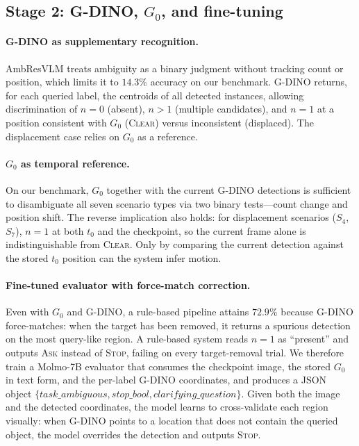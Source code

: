 \documentclass{article}
\begin{document}
\subsection{Stage 2: G-DINO, $G_0$, and fine-tuning}

\paragraph{G-DINO as supplementary recognition.}
AmbResVLM treats ambiguity as a binary judgment without tracking count
or position, which limits it to $14.3\%$ accuracy on our benchmark.
G-DINO returns, for each queried label, the centroids of all detected
instances, allowing discrimination of $n=0$ (absent), $n>1$ (multiple
candidates), and $n=1$ at a position consistent with $G_0$
(\textsc{Clear}) versus inconsistent (displaced). The displacement case
relies on $G_0$ as a reference.

\paragraph{$G_0$ as temporal reference.}
On our benchmark, $G_0$ together with the current G-DINO detections is
sufficient to disambiguate all seven scenario types via two binary
tests---count change and position shift. The reverse implication also
holds: for displacement scenarios ($S_4$, $S_7$), $n=1$ at both $t_0$
and the checkpoint, so the current frame alone is indistinguishable
from \textsc{Clear}. Only by comparing the current detection against
the stored $t_0$ position can the system infer motion.

\paragraph{Fine-tuned evaluator with force-match correction.}
Even with $G_0$ and G-DINO, a rule-based pipeline attains $72.9\%$
because G-DINO force-matches: when the target has been removed, it
returns a spurious detection on the most query-like region. A
rule-based system reads $n=1$ as ``present'' and outputs \textsc{Ask}
instead of \textsc{Stop}, failing on every target-removal trial. We
therefore train a Molmo-7B evaluator that consumes the checkpoint
image, the stored $G_0$ in text form, and the per-label G-DINO
coordinates, and produces a JSON object
$\{\textit{task\_ambiguous},\textit{stop\_bool},\textit{clarifying\_question}\}$.
Given both the image and the detected coordinates, the model learns to
cross-validate each region visually: when G-DINO points to a location
that does not contain the queried object, the model overrides the
detection and outputs \textsc{Stop}.
\end{document}
